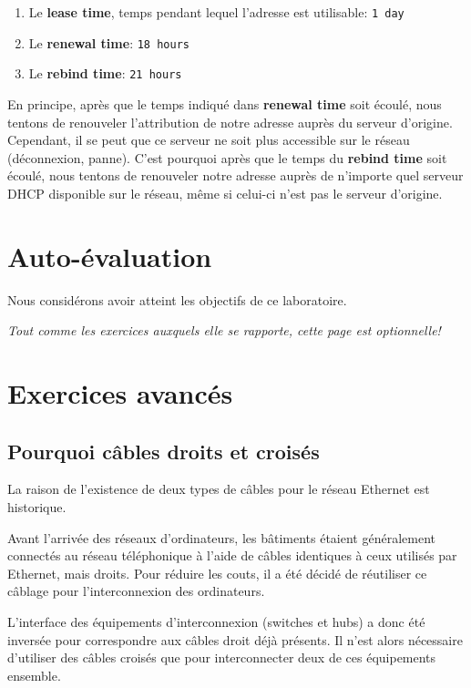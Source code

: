 \documentclass[11pt,a4paper]{article}
\begin{document}
\begin{enumerate}
	\item Le \textbf{lease time}, temps pendant lequel l'adresse est utilisable: \texttt{1 day}
	\item Le \textbf{renewal time}: \texttt{18 hours}
	\item Le \textbf{rebind time}: \texttt{21 hours}
\end{enumerate}

En principe, après que le temps indiqué dans \textbf{renewal time} soit écoulé, nous tentons de renouveler l'attribution de notre adresse auprès du serveur d'origine. Cependant, il se peut que ce serveur ne soit plus accessible sur le réseau (déconnexion, panne). C'est pourquoi après que le temps du \textbf{rebind time} soit écoulé, nous tentons de renouveler notre adresse auprès de n'importe quel serveur DHCP disponible sur le réseau, même si celui-ci n'est pas le serveur d'origine.

\section{Auto-évaluation}

Nous considérons avoir atteint les objectifs de ce laboratoire.

\pagebreak

\textit{Tout comme les exercices auxquels elle se rapporte, cette page est optionnelle!}

\section{Exercices avancés}

\subsection{Pourquoi câbles droits et croisés}

La raison de l'existence de deux types de câbles pour le réseau Ethernet est historique.

Avant l'arrivée des réseaux d'ordinateurs, les bâtiments étaient généralement connectés au réseau téléphonique à l'aide de câbles identiques à ceux utilisés par Ethernet, mais droits. Pour réduire les couts, il a été décidé de réutiliser ce câblage pour l'interconnexion des ordinateurs.

L'interface des équipements d'interconnexion (switches et hubs) a donc été inversée pour correspondre aux câbles droit déjà présents. Il n'est alors nécessaire d'utiliser des câbles croisés que pour interconnecter deux de ces équipements ensemble.
\end{document}
